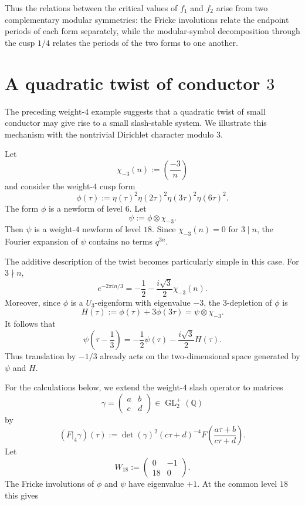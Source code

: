\documentclass[preprint,12pt]{elsarticle}
\theoremstyle{definition}
\theoremstyle{remark}
\begin{document}
	Thus the relations between the critical values of $f_1$ and $f_2$ arise from two complementary modular symmetries: the Fricke involutions relate the endpoint periods of each form separately, while the modular-symbol decomposition through the cusp $1/4$ relates the periods of the two forms to one another.
\section{A quadratic twist of conductor $3$}\label{conductor3}
\label{sec:conductor-three}

The preceding weight-$4$ example suggests that a quadratic twist of small conductor may give rise to a small slash-stable system. We illustrate this mechanism with the nontrivial Dirichlet character modulo $3$.

Let
\[
\chi_{-3}(n):=\left(\frac{-3}{n}\right)
\]
and consider the weight-$4$ cusp form
\[
\phi(\tau):=\eta(\tau)^2\eta(2\tau)^2\eta(3\tau)^2\eta(6\tau)^2.
\]
The form $\phi$ is a newform of level $6$.  Let
\[
\psi:=\phi\otimes\chi_{-3}.
\]
Then $\psi$ is a weight-$4$ newform of level $18$.  Since $\chi_{-3}(n)=0$ for $3\mid n$, the Fourier expansion of $\psi$ contains no terms $q^{3n}$.

The additive description of the twist becomes particularly simple in this case.  For $3\nmid n$,
\[
e^{-2\pi i n/3}=-\frac{1}{2}-\frac{i\sqrt{3}}{2}\chi_{-3}(n).
\]
Moreover, since $\phi$ is a $U_3$-eigenform with eigenvalue $-3$, the $3$-depletion of $\phi$ is
\[
H(\tau):=\phi(\tau)+3\phi(3\tau)=\psi\otimes\chi_{-3}.
\]
It follows that
\begin{equation}\label{eq:cond3-translation}
\psi\left(\tau-\frac{1}{3}\right)=	-\frac{1}{2}\psi(\tau)-\frac{i\sqrt{3}}{2}H(\tau).
\end{equation}
Thus translation by $-1/3$ already acts on the two-dimensional space generated by $\psi$ and $H$.

For the calculations below, we extend the weight-$4$ slash operator to matrices
\[
\gamma=
\begin{pmatrix}
	a&b\\
	c&d
\end{pmatrix}
\in\operatorname{GL}_2^+(\mathbb{Q})
\]
by
\[
(F|_4\gamma)(\tau)
:=
\det(\gamma)^2(c\tau+d)^{-4}
F\left(\frac{a\tau+b}{c\tau+d}\right).
\]
Let
\[
W_{18}:=
\begin{pmatrix}
	0&-1\\
	18&0
\end{pmatrix}.
\]
The Fricke involutions of $\phi$ and $\psi$ have eigenvalue $+1$.  At the common level $18$ this gives
\end{document}
